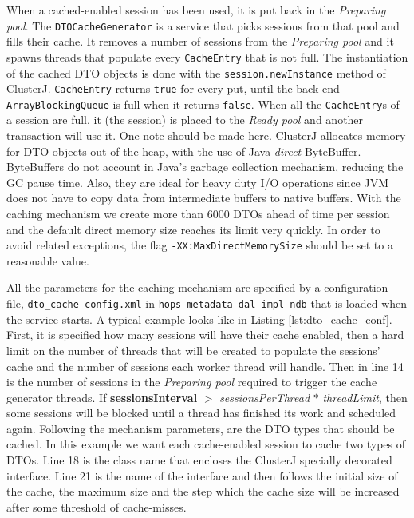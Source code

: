 When a cached-enabled session has been used, it is put back in the
\emph{Preparing pool}. The \texttt{DTOCacheGenerator} is a service
that picks sessions from that pool and fills their cache. It removes a
number of sessions from the \emph{Preparing pool} and it spawns threads
that populate every \texttt{CacheEntry} that is not
full. The instantiation of the cached DTO objects is done with the
\texttt{session.newInstance} method of ClusterJ. \texttt{CacheEntry} returns
\texttt{true} for every put, until
the back-end \texttt{ArrayBlockingQueue} is full when it returns
\texttt{false}. When all the \texttt{CacheEntry}s of a session are
full, it (the session) is placed to the \emph{Ready pool} and another
transaction will use it. One note should be made here. ClusterJ
allocates memory for DTO objects out of the heap, with the use of
Java \emph{direct} ByteBuffer. ByteBuffers do not account in Java's
garbage collection mechanism, reducing the GC pause time. Also, they are ideal
for heavy duty I/O operations since JVM does not have to copy data
from intermediate buffers to native buffers. With the caching
mechanism we create more than 6000 DTOs ahead of time per
session and the default direct memory size reaches its limit very
quickly. In order to avoid related exceptions, the flag
\texttt{-XX:MaxDirectMemorySize} should be set to a reasonable value.



All the parameters for the caching mechanism are specified by a
configuration file, \texttt{dto\_cache-config.xml} in
\texttt{hops-metadata-dal-impl-ndb} that is loaded when
the service starts. A typical example looks like in Listing
\ref{lst:dto_cache_conf}. First, it is specified how many sessions
will have their cache enabled, then a hard limit on the number
of threads that will be created to populate the sessions' cache and
the number of sessions each worker thread will handle. Then in line 14
is the number of sessions in the \emph{Preparing pool} required to
trigger the cache generator threads. If \textbf{sessionsInterval}
$>$ \emph{sessionsPerThread} $*$ \emph{threadLimit}, then some
sessions will be blocked until a thread has finished its work and
scheduled again. Following the mechanism parameters, are the DTO types
that should be cached. In this example we want each cache-enabled
session to cache two types of DTOs. Line 18 is the class name that
encloses the ClusterJ specially decorated interface. Line 21 is the
name of the interface and then follows the initial size of the cache,
the maximum size and the step which the cache size will be increased after some
threshold of cache-misses.

